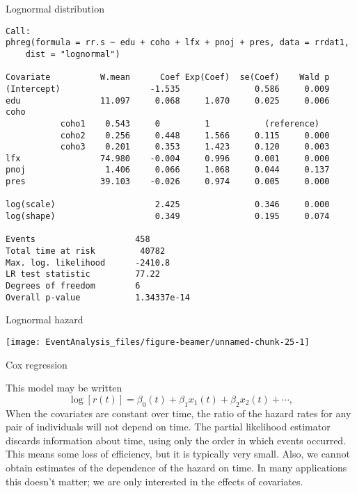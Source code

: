 \documentclass[10pt,ignorenonframetext,]{beamer}
\begin{document}
\begin{frame}[fragile]{Lognormal distribution}

\tiny

\begin{verbatim}
Call:
phreg(formula = rr.s ~ edu + coho + lfx + pnoj + pres, data = rrdat1, 
    dist = "lognormal")

Covariate          W.mean      Coef Exp(Coef)  se(Coef)    Wald p
(Intercept)                  -1.535               0.586     0.009 
edu                11.097     0.068     1.070     0.025     0.006 
coho 
           coho1    0.543     0         1           (reference)
           coho2    0.256     0.448     1.566     0.115     0.000 
           coho3    0.201     0.353     1.423     0.120     0.003 
lfx                74.980    -0.004     0.996     0.001     0.000 
pnoj                1.406     0.066     1.068     0.044     0.137 
pres               39.103    -0.026     0.974     0.005     0.000 

log(scale)                    2.425               0.346     0.000 
log(shape)                    0.349               0.195     0.074 

Events                    458 
Total time at risk         40782 
Max. log. likelihood      -2410.8 
LR test statistic         77.22 
Degrees of freedom        6 
Overall p-value           1.34337e-14
\end{verbatim}

\end{frame}

\begin{frame}{Lognormal hazard}

\begin{center}\texttt{[image: EventAnalysis\_files/figure-beamer/unnamed-chunk-25-1]} \end{center}

\end{frame}

\begin{frame}{Cox regression}

This model may be written \[
\log[r(t)] = \beta_0(t) + \beta_1 x_1(t) + \beta_2 x_2(t) + \cdots,
\] When the covariates are constant over time, the ratio of the hazard
rates for any pair of individuals will not depend on time. The partial
likelihood estimator discards information about time, using only the
order in which events occurred. This means some loss of efficiency, but
it is typically very small. Also, we cannot obtain estimates of the
dependence of the hazard on time. In many applications this doesn't
matter; we are only interested in the effects of covariates.

\end{frame}
\end{document}
